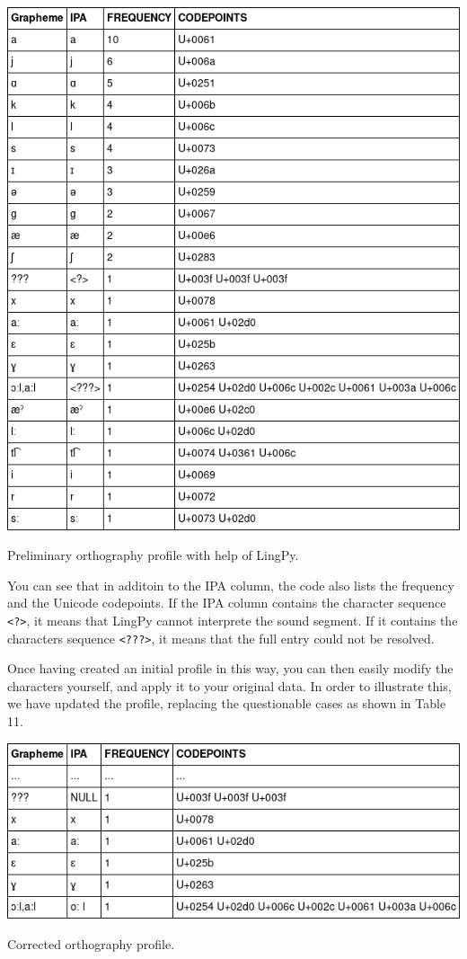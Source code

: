 \documentclass[a4paper,svgnames]{scrartcl}
\begin{document}
\begin{table}
\centering
\includegraphics{images/table-10.png}
\caption{Preliminary orthography profile with help of LingPy.}
\end{table}

You can see that in additoin to the IPA column, the code also lists the
frequency and the Unicode codepoints. If the IPA column contains the
character sequence \texttt{\textless{}?\textgreater{}}, it means that
LingPy cannot interprete the sound segment. If it contains the
characters sequence \texttt{\textless{}???\textgreater{}}, it means that
the full entry could not be resolved.

Once having created an initial profile in this way, you can then easily
modify the characters yourself, and apply it to your original data. In
order to illustrate this, we have updated the profile, replacing the
questionable cases as shown in Table 11.

\begin{table}
\centering
\includegraphics{images/table-11.png}
\caption{Corrected orthography profile.}
\end{table}
\end{document}
